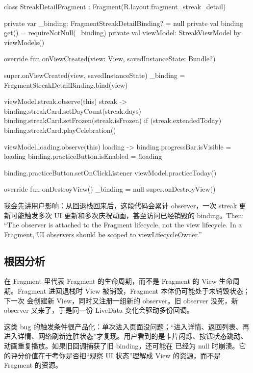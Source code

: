\begin{ktbug}
class StreakDetailFragment : Fragment(R.layout.fragment_streak_detail) {
    private var _binding: FragmentStreakDetailBinding? = null
    private val binding get() = requireNotNull(_binding)
    private val viewModel: StreakViewModel by viewModels()

    override fun onViewCreated(view: View, savedInstanceState: Bundle?) {
        super.onViewCreated(view, savedInstanceState)
        _binding = FragmentStreakDetailBinding.bind(view)

        viewModel.streak.observe(this) { streak ->
            binding.streakCard.setDayCount(streak.days)
            binding.streakCard.setFrozen(streak.isFrozen)
            if (streak.extendedToday) {
                binding.streakCard.playCelebration()
            }
        }

        viewModel.loading.observe(this) { loading ->
            binding.progressBar.isVisible = loading
            binding.practiceButton.isEnabled = !loading
        }

        binding.practiceButton.setOnClickListener {
            viewModel.practiceToday()
        }
    }

    override fun onDestroyView() {
        _binding = null
        super.onDestroyView()
    }
}
\end{ktbug}

\begin{sayit}[面试里怎么说]
我会先讲用户影响：从回退栈回来后，这段代码会累计 observer，一次 streak 更新可能触发多次 UI 更新和多次庆祝动画，甚至访问已经销毁的 binding。Then: ``The observer is attached to the Fragment lifecycle, not the view lifecycle. In a Fragment, UI observers should be scoped to viewLifecycleOwner.''
\end{sayit}

\subsection*{根因分析}
 在 Fragment 里代表 Fragment 的生命周期，而不是 Fragment 的 View 生命周期。Fragment 进回退栈时 View 被销毁，Fragment 本体仍可能处于未销毁状态；下一次  会创建新 View，同时又注册一组新的 observer。旧 observer 没死，新 observer 又来了，于是同一份 LiveData 变化会驱动多份回调。

这类 bug 的触发条件很产品化：单次进入页面没问题；“进入详情、返回列表、再进入详情、网络刷新连胜状态”才复现。用户看到的是卡片闪烁、按钮状态跳动、动画重复播放。如果旧回调捕获了旧 binding，还可能在  已经为 null 时崩溃。它的评分价值在于考你是否把“观察 UI 状态”理解成 View 的资源，而不是 Fragment 的资源。

